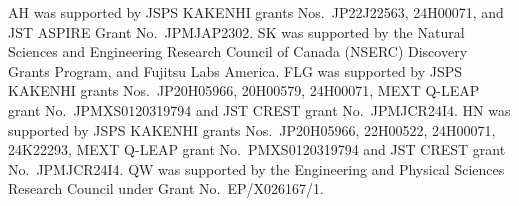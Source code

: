 \documentclass[11pt]{article}
\theoremstyle{remark}
\begin{document}
AH was supported by JSPS KAKENHI grants Nos.~JP22J22563, 24H00071, and  JST ASPIRE Grant No.~JPMJAP2302. SK was supported by the Natural Sciences and Engineering Research Council of Canada (NSERC) Discovery Grants Program, and Fujitsu Labs America. FLG was supported by JSPS KAKENHI grants Nos.~JP20H05966, 20H00579, 24H00071, MEXT Q-LEAP grant No.~JPMXS0120319794 and JST CREST grant No.~JPMJCR24I4. HN was supported by JSPS KAKENHI grants Nos.~JP20H05966, 22H00522, 24H00071, 24K22293, MEXT Q-LEAP grant No.~PMXS0120319794 and JST CREST grant No.~JPMJCR24I4. QW was supported by the Engineering and Physical Sciences Research Council under Grant No.~EP/X026167/1.



\end{document}
